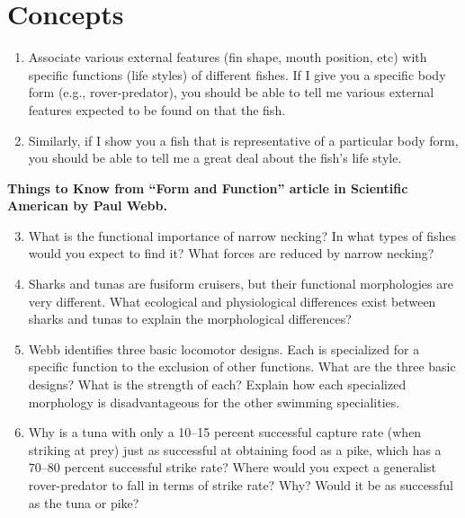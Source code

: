 \documentclass[nofonts, letterpaper]{tufte-handout}
\begin{document}
\section{Concepts}

\begin{enumerate}
\item Associate various external features (fin shape, mouth position, etc) with specific functions (life styles) of different fishes.  If I give you a specific body form (e.g., rover-predator), you should be able to tell me various external features expected to be found on that the fish.

\item Similarly, if I show you a fish that is representative of a particular body form, you should be able to tell me a great deal about the fish’s life style.  
\end{enumerate}

\noindent\textbf{Things to Know from “Form and Function” article in Scientific American by Paul Webb.}

\begin{enumerate}
	\setcounter{enumi}{2}
	\item What is the functional importance of narrow necking?  In what types of fishes would you expect to find it?  What forces are reduced by narrow necking?

	\item Sharks and tunas are fusiform cruisers, but their functional morphologies are very different.  What ecological and physiological differences exist between sharks and tunas to explain the morphological differences?

	\item Webb identifies three basic locomotor designs.  Each is specialized for a specific function to the exclusion of other functions.  What are the three basic designs?  What is the strength of each?  Explain how each specialized morphology is disadvantageous for the other swimming specialities.

	\item Why is a tuna with only a 10--15 percent successful capture rate (when striking at prey) just as successful at obtaining food as a pike, which has a 70--80 percent successful strike rate?  Where would you expect a generalist rover-predator to fall in terms of strike rate?  Why?  Would it be as successful as the tuna or pike?
\end{enumerate}
\end{document}
